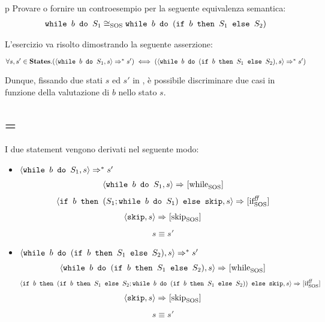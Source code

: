 
p
{Provare o fornire un controesempio per la seguente equivalenza semantica:
\begin{align*}
\wbS{b}{S_1} \eqSOS \wbS{b}{(\ifABC{b}{S_1}{S_2})}
\end{align*}}
{}

L'esercizio va risolto dimostrando la seguente asserzione:

$\forall{s,s'} \in \states.
  (\confSs{\wbS{b}{S_1}}{s} \Rar{*} s')
  \iff
  (\confSs{\wbS{b}{(\ifABC{b}{S_1}{S_2})}}{s} \Rar{*} s')
$

Dunque, fissando due stati $s$ ed $s'$ in \states, è possibile discriminare due
casi in funzione della valutazione di $b$ nello stato $s$.

\subsection{ = \semfalse}
I due statement vengono derivati nel seguente modo:

\begin{itemize}
  \item $\confSs{\wbS{b}{S_1}}{s} \Rar{*} s'$
\begin{align*}
\confSs{\wbS{b}{S_1}}{s} \Rar{}
\whileSOS
\end{align*}
\begin{align*}
\confSs{\ifABC{b}{(S_1;\wbS{b}{S_1})}{\skipForFriends}}{s} \Rar{}
\ifffSOS
\end{align*}
\begin{align*}
\confSs{\skipForFriends}{s} \Rar{}
\skipSOS
\end{align*}
\begin{align*}
s \equiv s'
\end{align*}
  \item $\confSs{\wbS{b}{(\ifABC{b}{S_1}{S_2})}}{s} \Rar{*} s'$
\begin{align*}
\confSs{\wbS{b}{(\ifABC{b}{S_1}{S_2})}}{s} \Rar{}
\whileSOS
\end{align*}
\begin{align*}
\confSs{\ifABC{b}
              {(\ifABC{b}{S_1}{S_2}; \wbS{b}{(\ifABC{b}{S_1}{S_2})})}
              {\skipForFriends}}
       {s} \Rar{}
\ifffSOS
\end{align*}
\begin{align*}
\confSs{\skipForFriends}{s} \Rar{}
\skipSOS
\end{align*}
\begin{align*}
s \equiv s'
\end{align*}
\end{itemize}

